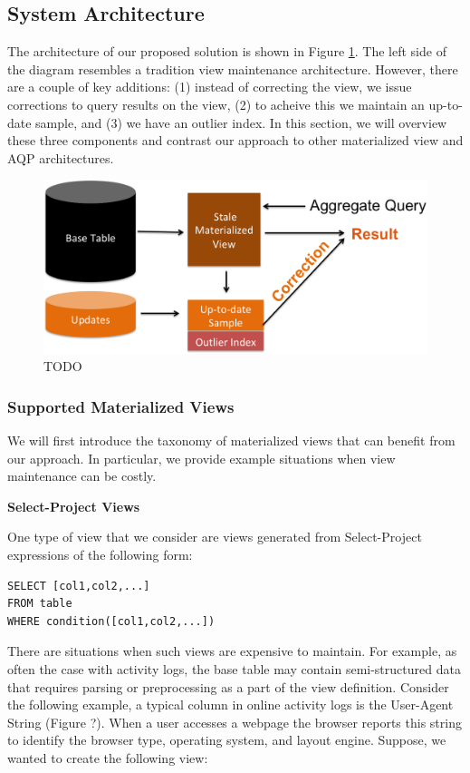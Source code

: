 \subsection{System Architecture}
The architecture of our proposed solution is shown in Figure \ref{sys-arch}.
The left side of the diagram resembles a tradition view maintenance architecture.
However, there are a couple of key additions: (1) instead of correcting the view,
we issue corrections to query results on the view, (2) to acheive this we maintain
an up-to-date sample, and (3) we have an outlier index.
In this section, we will overview these three components and contrast our approach 
to other materialized view and AQP architectures.

\begin{figure}[h]
\label{sys-arch}
\centering
 \includegraphics[width=\columnwidth]{figs/sys-arch.png}
 \caption{TODO}
\end{figure}

\subsubsection{Supported Materialized Views}
We will first introduce the taxonomy of materialized views
that can benefit from our approach. In particular, we provide example
situations when view maintenance can be costly. 

\vspace{1em}

\noindent\textbf{Select-Project Views}

One type of view that we consider are views generated from Select-Project
expressions of the following form:

\begin{lstlisting}
SELECT [col1,col2,...] 
FROM table 
WHERE condition([col1,col2,...]) 
\end{lstlisting}

There are situations when such views are expensive to maintain. For
example, as often the case with activity logs, the base table may
contain semi-structured data that requires parsing or preprocessing
as a part of the view definition. Consider the following example,
a typical column in online activity logs is the User-Agent String
(Figure ?). When a user accesses a webpage the browser reports this
string to identify the browser type, operating system, and layout
engine. Suppose, we wanted to create the following view:

